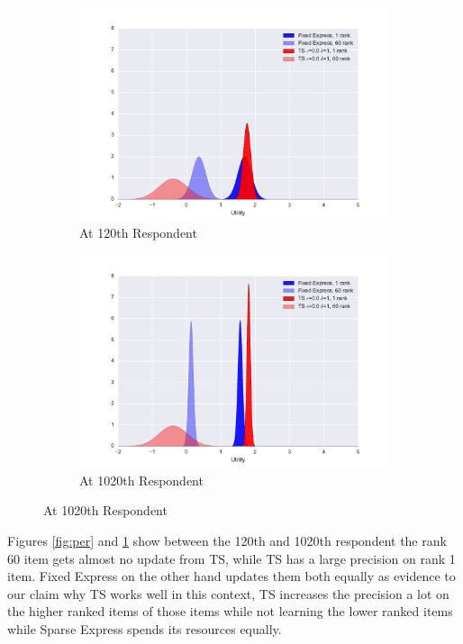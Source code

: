 \documentclass[nonblindrev]{informs3}
\begin{document}
\begin{figure}[!ht]
\caption{Distrubution of Utility Belief Distribution}
\begin{subfigure}{.5\textwidth}
\caption{At 120th Respondent}
\includegraphics[width=1\textwidth]{plots/beliefdistrBegin.pdf}
\end{subfigure}
\begin{subfigure}{.5\textwidth}
\caption{At 1020th Respondent}
\includegraphics[width=1\textwidth]{plots/beliefdistrEnd.pdf}
\end{subfigure}
\label{fig:belief}
\end{figure}
Figures \ref{fig:per} and \ref{fig:belief} show between the 120th and 1020th respondent the rank 60 item gets almost no update from TS, while TS has a large precision on rank 1 item. Fixed Express on the other hand updates them both equally as evidence to our claim why TS works well in this context, TS increases the precision a lot on the higher ranked items of those items while not learning the lower ranked items while Sparse Express spends its resources equally.
\end{document}
